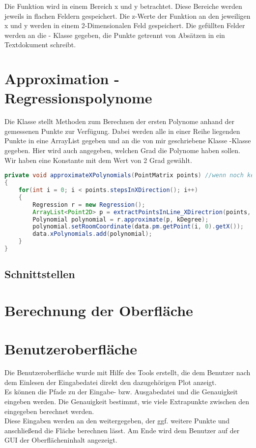 \documentclass[11pt, bibliography=totocnumbered]{scrartcl}
\begin{document}
Die Funktion wird in einem Bereich x und y betrachtet. Diese Bereiche werden jeweils in flachen Feldern gespeichert. Die z-Werte der Funktion an den jeweiligen x und y werden in einem 2-Dimensionalen Feld gespeichert.
Die gef\"ullten Felder werden an die \grqq - Klasse gegeben, die Punkte getrennt von Abs\"atzen in ein Textdokument schreibt.

\section{Approximation - Regressionspolynome}
Die Klasse \grqq stellt Methoden zum Berechnen der ersten Polynome anhand der gemessenen Punkte zur Verf\"ugung. Dabei werden alle in einer Reihe liegenden Punkte in eine ArrayList gegeben und an die von mir geschriebene Klasse \grqq-Klasse gegeben. Hier wird auch angegeben, welchen Grad die Polynome haben sollen. Wir haben eine Konstante mit dem Wert von 2 Grad gew\"ahlt.

\begin{lstlisting}[caption={Polynome mit x als Raumkoordinate}, label={lst:label}, language=Java]
private void approximateXPolynomials(PointMatrix points) //wenn noch keine Stützpunkte vorhanden sind
{
	for(int i = 0; i < points.stepsInXDirection(); i++)
	{
		Regression r = new Regression();
		ArrayList<Point2D> p = extractPointsInLine_XDirectrion(points, i);
		Polynomial polynomial = r.approximate(p, kDegree);
		polynomial.setRoomCoordinate(data.pm.getPoint(i, 0).getX());
		data.xPolynomials.add(polynomial);
	}
}
\end{lstlisting}


\subsection{Schnittstellen}

\section{Berechnung der Oberfl\"ache}

\section{Benutzeroberfl\"ache}

Die Benutzeroberfl\"ache wurde mit Hilfe des Tools \grqq erstellt, die dem Benutzer nach dem Einlesen der Eingabedatei direkt den dazugeh\"origen Plot anzeigt. \\ 
Es k\"onnen die Pfade zu der Eingabe- bzw. Ausgabedatei und die Genauigkeit eingeben werden. Die Genauigkeit bestimmt, wie viele Extrapunkte zwischen den eingegeben berechnet werden. \\
Diese Eingaben werden an den \grqq weitergegeben, der ggf. weitere Punkte und anschlie{\ss}end die Fl\"ache berechnen l\"asst. Am Ende wird dem Benutzer auf der GUI der Oberfl\"acheninhalt angezeigt. 
\end{document}
